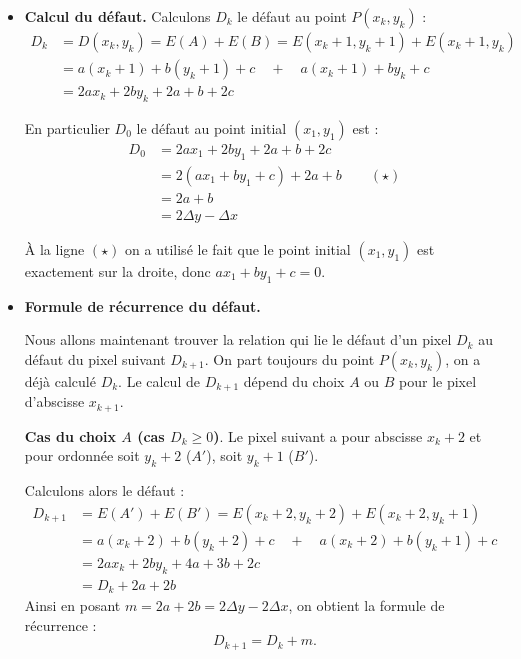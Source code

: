 \documentclass[11pt,class=report,crop=false]{standalone}
\begin{document}
\begin{itemize}
	
	\item \textbf{Calcul du défaut.}
	Calculons $D_k$ le défaut au point $P(x_k,y_k)$ :
    \begin{align*}
	D_k 
	&= D(x_k,y_k) = E(A) + E(B) = E(x_k+1,y_k+1)+E(x_k+1,y_k) \\
	&= a (x_k+1) +b(y_k+1) + c \quad + \quad a (x_k+1) +by_k + c  \\
	&= 2a x_k +2b y_k + 2a+b+2c
   \end{align*}	
	
	En particulier $D_0$ le défaut au point initial $(x_1,y_1)$ est :
	\begin{align*}
	D_0 
	  &= 2a x_1 +2b y_1 + 2a+b+2c \\
	  &= 2(ax_1+by_1+c) + 2a+b   \qquad (\star)\\
	  &= 2a + b  \\
	  &= 2\Delta y - \Delta x 
	\end{align*}
	
	À la ligne $(\star)$ on a utilisé le fait que le point initial $(x_1,y_1)$ est exactement sur la droite, donc $ax_1+by_1+c=0$.
		
	\item \textbf{Formule de récurrence du défaut.}
	
	Nous allons maintenant trouver la relation qui lie le défaut d'un pixel $D_k$ au défaut du pixel suivant $D_{k+1}$.
	On part toujours du point $P(x_k,y_k)$, on a déjà calculé $D_k$. Le calcul de $D_{k+1}$ dépend du choix $A$ ou $B$ pour le pixel d'abscisse $x_{k+1}$.
	
	
	\textbf{Cas du choix $A$ (cas $D_k\ge0$)}.
	Le pixel suivant a pour abscisse $x_k+2$ et pour ordonnée soit $y_k+2$ ($A'$), soit $y_k+1$ ($B'$).
	


	
	Calculons alors le défaut :
	\begin{align*}
		D_{k+1} 
		&= E(A') + E(B') = E(x_k+2,y_k+2)+E(x_k+2,y_k+1) \\
		&= a (x_k+2) +b(y_k+2) + c \quad + \quad a (x_k+2) +b(y_k+1) + c  \\
		&= 2a x_k + 2by_k + 4a+3b+2c\\
		&= D_k + 2a+2b
	\end{align*}
	Ainsi en posant $m = 2a+2b = 2\Delta y - 2 \Delta x$, on obtient la formule de récurrence :
	$$D_{k+1} = D_k + m.$$
	

\end{itemize}
\end{document}
